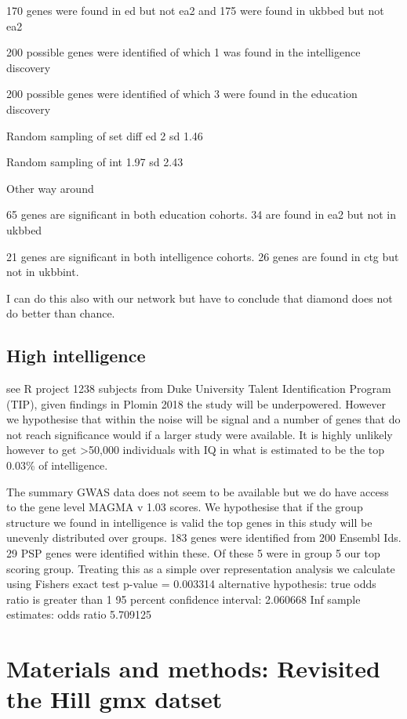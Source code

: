 170 genes were found in ed but not ea2 and 175 were found in ukbbed but not ea2

200 possible genes were identified of which 1 was found in the intelligence discovery

200 possible genes were identified of which 3 were found in the education discovery

Random sampling of set diff ed 2 sd 1.46

Random sampling of int 1.97 sd 2.43

Other way around

65 genes are significant in both education cohorts. 34 are found in ea2 but not in ukbbed

21 genes are significant in both intelligence cohorts. 26 genes are found in ctg but not in ukbbint. 

I can do this also with our network but have to conclude that diamond does not do better than chance. 
\subsection{High intelligence}
\cite{zabaneh2018genome}
see R project
1238 subjects from Duke University Talent Identification Program (TIP), given findings in Plomin 2018 the study will be underpowered. However we hypothesise that within the noise will be signal and a number of genes that do not reach significance would if a larger study were available. It is highly unlikely however to get >50,000 individuals with IQ in what is estimated to be the top 0.03\% of intelligence. 

The summary GWAS data does not seem to be available but we do have access to the gene level MAGMA v 1.03 scores. We hypothesise that if the group structure we found in intelligence is valid the top genes in this study will be unevenly distributed over groups. 183 genes were identified from 200 Ensembl Ids. 29 PSP genes were identified within these. Of these 5 were in group 5 our top scoring group. Treating this as a simple over representation analysis we calculate using Fishers exact test 	
p-value = 0.003314
alternative hypothesis: true odds ratio is greater than 1
95 percent confidence interval:
 2.060668      Inf
sample estimates:
odds ratio 
  5.709125 




\section{Materials and methods: Revisited the Hill gmx datset}

